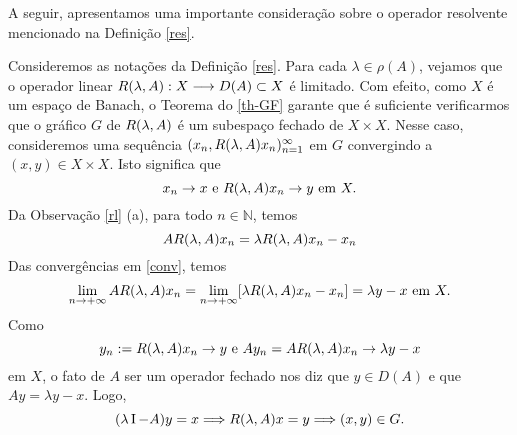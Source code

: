 A seguir, apresentamos uma importante consideração sobre o operador resolvente mencionado na Definição \ref{res}.

\begin{remark}\label{reslim}
    Consideremos as notações da Definição \ref{res}. Para cada $\lambda \in \rho (A)$, vejamos que o operador linear $R(\lambda,A) :X\longrightarrow D(A) \subset X$ é limitado. Com efeito, como $X$ é um espaço de Banach, o Teorema do \ref{th-GF} garante que é suficiente verificarmos que o gráfico $G$ de $R(\lambda,A)$ é um subespaço fechado de $X\times X$. Nesse caso, consideremos uma sequência $(x_n ,R(\lambda,A) x_n )_{n=1}^{\infty}$ em $G$ convergindo a $(x,y)\in X\times X$. Isto significa que
    \begin{equation}\label{conv}
    \displaystyle x_n \to x \text{  e 
 } R(\lambda,A) x_n \to y \text{ em } X.
    \end{equation}
    Da Observação \ref{rl} (a), para todo $n\in \mathbb N$, temos
    \[
    \displaystyle AR(\lambda,A) x_n = \lambda R(\lambda,A) x_n -x_n 
    \]
    Das convergências em \eqref{conv}, temos
    \[
    \displaystyle\lim_{n\to +\infty} AR(\lambda,A) x_n 
    = \lim_{n\to +\infty} [\lambda R(\lambda,A) x_n - x_n] = \lambda y-x \text{  em  } X.
    \]
    Como 
    \[
    \displaystyle y_n :=R(\lambda,A) x_n \to y \text{  e   } Ay_n  = AR(\lambda,A) x_n \to \lambda y-x
    \]
    em $X$, o fato de $A$ ser um operador fechado nos diz que $y\in D(A)$ e que $Ay = \lambda y-x$. Logo,
    \[
    \displaystyle (\lambda \operatorname{I} -A)y =x \Longrightarrow R(\lambda,A) x=y \Longrightarrow (x,y)\in G.
    \]
\end{remark}
